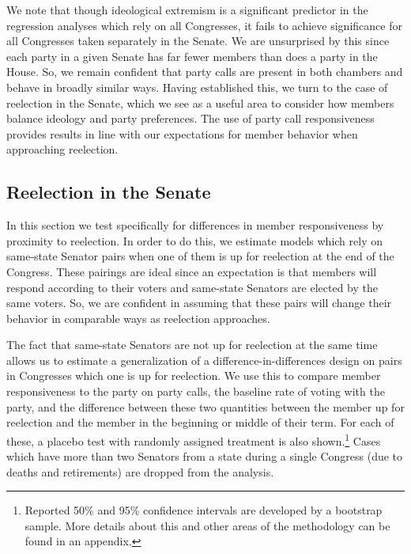 \documentclass[12pt]{article}
\begin{document}
We note that though ideological extremism is a significant predictor in the regression analyses which rely on all Congresses, it fails to achieve significance for all Congresses taken separately in the Senate. We are unsurprised by this since each party in a given Senate has far fewer members than does a party in the House. So, we remain confident that party calls are present in both chambers and behave in broadly similar ways. Having established this, we turn to the case of reelection in the Senate, which we see as a useful area to consider how members balance ideology and party preferences. The use of party call responsiveness provides results in line with our expectations for member behavior when approaching reelection.

\subsection{Reelection in the Senate}

In this section we test specifically for differences in member responsiveness by proximity to reelection. In order to do this, we estimate models which rely on same-state Senator pairs when one of them is up for reelection at the end of the Congress. These pairings are ideal since an expectation is that members will respond according to their voters and same-state Senators are elected by the same voters. So, we are confident in assuming that these pairs will change their behavior in comparable ways as reelection approaches. 

The fact that same-state Senators are not up for reelection at the same time allows us to estimate a generalization of a difference-in-differences design on pairs in Congresses which one is up for reelection. We use this to compare member responsiveness to the party on party calls, the baseline rate of voting with the party, and the difference between these two quantities between the member up for reelection and the member in the beginning or middle of their term. For each of these, a placebo test with randomly assigned treatment is also shown.\footnote{Reported 50\% and 95\% confidence intervals are developed by a bootstrap sample. More details about this and other areas of the methodology can be found in an appendix.} Cases which have more than two Senators from a state during a single Congress (due to deaths and retirements) are dropped from the analysis.
\end{document}
